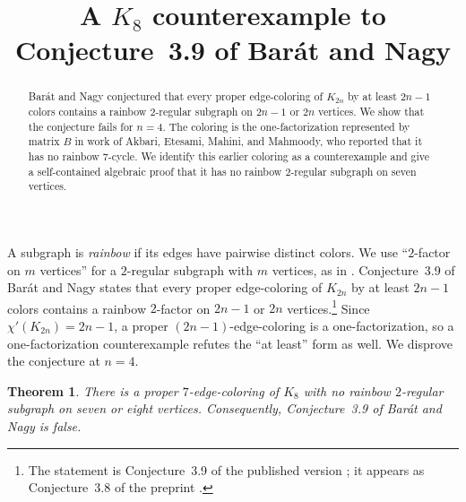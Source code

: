 \documentclass[11pt]{amsart}
\title[A $K_8$ counterexample]
      {A $K_8$ counterexample to Conjecture~3.9 of Bar\'at and Nagy}
\date{}
\newtheorem{theorem}{Theorem}
\begin{document}
\begin{abstract}
Bar\'at and Nagy conjectured that every proper edge-coloring of $K_{2n}$
by at least $2n-1$ colors contains a rainbow $2$-regular subgraph on
$2n-1$ or $2n$ vertices.  We show that the conjecture fails for $n=4$.  The
coloring is the one-factorization represented by matrix $B$ in work of
Akbari, Etesami, Mahini, and Mahmoody, who reported that it has no
rainbow $7$-cycle.  We identify this earlier coloring as a counterexample
and give a self-contained algebraic proof that it has no rainbow
$2$-regular subgraph on seven vertices.
\end{abstract}

\maketitle

A subgraph is \emph{rainbow} if its edges have pairwise distinct colors.
We use ``$2$-factor on $m$ vertices'' for a $2$-regular subgraph with
$m$ vertices, as in \cite{BN}.  Conjecture~3.9 of Bar\'at and Nagy states
that every proper edge-coloring of $K_{2n}$ by at least $2n-1$ colors
contains a rainbow $2$-factor on $2n-1$ or $2n$ vertices.\footnote{The
statement is Conjecture~3.9 of the published version \cite{BN}; it appears
as Conjecture~3.8 of the preprint \cite{BNpre}.}  Since
$\chi'(K_{2n})=2n-1$, a proper $(2n-1)$-edge-coloring is a
one-factorization, so a one-factorization counterexample refutes the
``at least'' form as well.  We disprove the conjecture at $n=4$.

\begin{theorem}\label{thm:main}
There is a proper $7$-edge-coloring of $K_8$ with no rainbow $2$-regular
subgraph on seven or eight vertices.  Consequently, Conjecture~3.9 of
Bar\'at and Nagy is false.
\end{theorem}
\end{document}
